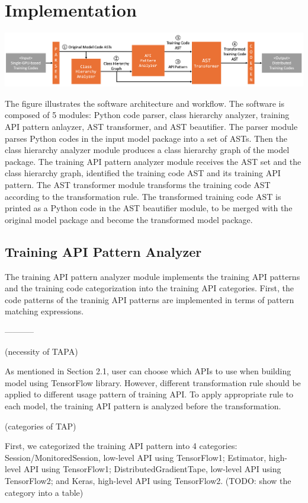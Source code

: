 \section{Implementation}\label{sec:impl}


\includegraphics[width=15cm]{system_arch}

The figure illustrates the software architecture and workflow.
The software is composed of 5 modules:
Python code parser, class hierarchy analyzer,
training API pattern anlayzer, AST transformer, and AST beautifier.
The parser module parses Python codes in the input model package into 
a set of ASTs. Then the class hierarchy analyzer module 
produces a class hierarchy graph of the model package.
The training API pattern analyzer module receives the AST set and
the class hierarchy graph, identified the training code AST and
its training API pattern. The AST transformer module
transforms the training code AST according to the transformation rule.
The transformed training code AST is printed as a Python code in the
AST beautifier module, to be merged with the original model package
and become the transformed model package.

\subsection{Training API Pattern Analyzer}

The training API pattern analyzer module implements the training API
patterns and the training code categorization into the training API categories.
First, the code patterns of the traninig API patterns are implemented
in terms of pattern matching expressions.

-----------

(necessity of TAPA)

As mentioned in Section 2.1, user can choose which APIs to use
when building model using TensorFlow library.
However, different transformation rule should be applied
to different usage pattern of training API.
To apply appropriate rule to each model,
the training API pattern is analyzed before the transformation.

(categories of TAP)

First, we categorized the training API pattern into 4 categories:
Session/MonitoredSession, low-level API using TensorFlow1;
Estimator, high-level API using TensorFlow1;
DistributedGradientTape, low-level API using TensorFlow2;
and Keras, high-level API using TensorFlow2.
(TODO: show the category into a table)

